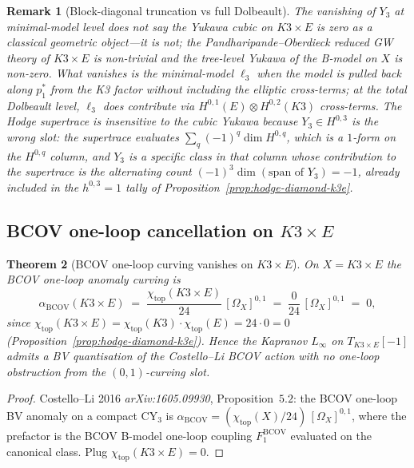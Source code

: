 \documentclass[11pt]{article}
\newtheorem{theorem}{Theorem}[section]
\newtheorem{remark}[theorem]{Remark}
\providecommand{\BCOV}{\mathrm{BCOV}}
\providecommand{\Om}{\Omega}
\begin{document}
\begin{remark}[Block-diagonal truncation vs full Dolbeault]
The vanishing of $Y_3$ at minimal-model level does \emph{not} say the
Yukawa cubic on $K3 \times E$ is zero as a classical geometric
object---it is not; the Pandharipande--Oberdieck reduced GW theory of
$K3 \times E$ is non-trivial and the tree-level Yukawa of the B-model
on $X$ is non-zero. What vanishes is the minimal-model $\ell_3$ when
the model is pulled back along $p_1^*$ from the K3 factor without
including the elliptic cross-terms; at the \emph{total} Dolbeault
level, $\ell_3$ does contribute via $H^{0, 1}(E) \otimes H^{0, 2}(K3)$
cross-terms. The Hodge supertrace is insensitive to the cubic Yukawa
because $Y_3 \in H^{0, 3}$ is the wrong slot: the supertrace evaluates
$\sum_q (-1)^q \dim H^{0, q}$, which is a $1$-form on the $H^{0, q}$
column, and $Y_3$ is a specific class in that column whose contribution
to the supertrace is the alternating count $(-1)^3 \dim(\text{span of } Y_3) = -1$,
already included in the $h^{0, 3} = 1$ tally of
Proposition~\ref{prop:hodge-diamond-k3e}.
\end{remark}

\subsection{BCOV one-loop cancellation on $K3 \times E$}

\begin{theorem}[BCOV one-loop curving vanishes on $K3 \times E$]
\label{thm:bcov-cancel-k3e-BL-2}
On $X = K3 \times E$ the BCOV one-loop anomaly curving is
\[
  \alpha_\BCOV(K3 \times E)
  \;=\; \frac{\chi_{\mathrm{top}}(K3 \times E)}{24}\, [\Om_X]^{0, 1}
  \;=\; \frac{0}{24}\, [\Om_X]^{0, 1}
  \;=\; 0,
\]
since $\chi_{\mathrm{top}}(K3 \times E) = \chi_{\mathrm{top}}(K3) \cdot
\chi_{\mathrm{top}}(E) = 24 \cdot 0 = 0$ (Proposition~\ref{prop:hodge-diamond-k3e}).
Hence the Kapranov $L_\infty$ on $T_{K3 \times E}[-1]$ admits a BV
quantisation of the Costello--Li BCOV action with no one-loop
obstruction from the $(0, 1)$-curving slot.
\end{theorem}

\begin{proof}
Costello--Li 2016 \emph{arXiv:1605.09930}, Proposition~$5.2$: the BCOV
one-loop BV anomaly on a compact CY$_3$ is $\alpha_\BCOV =
(\chi_{\mathrm{top}}(X)/24)\, [\Om_X]^{0, 1}$, where the prefactor is
the BCOV B-model one-loop coupling $F_1^{\mathrm{BCOV}}$ evaluated on
the canonical class. Plug $\chi_{\mathrm{top}}(K3 \times E) = 0$.
\end{proof}
\end{document}

